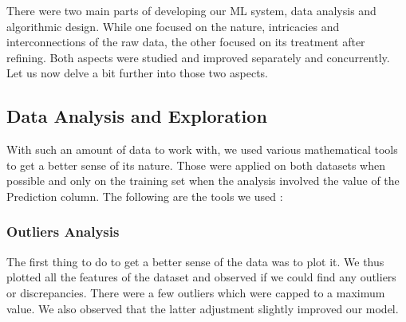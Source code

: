 \documentclass[10pt,conference,compsocconf]{IEEEtran}
\begin{document}
There were two main parts of developing our ML system, data analysis and algorithmic design. While one focused on the nature, intricacies and interconnections of the raw data, the other focused on its treatment after refining. Both aspects were studied and improved separately and concurrently.  Let us now delve a bit further into those two aspects.

\subsection{Data Analysis and Exploration}
With such an amount of data to work with, we used various mathematical tools to get a better sense of its nature.
Those were applied on both datasets when possible and only on the training set when the analysis involved the value of the Prediction column. The following are the tools we used :

\subsubsection{Outliers Analysis}
The first thing to do to get a better sense of the data was to plot it. We thus plotted all the features of the dataset and observed if we could find any outliers or discrepancies. There were a few outliers which were capped to a maximum value. We also observed that the latter adjustment slightly improved our model.
\end{document}
